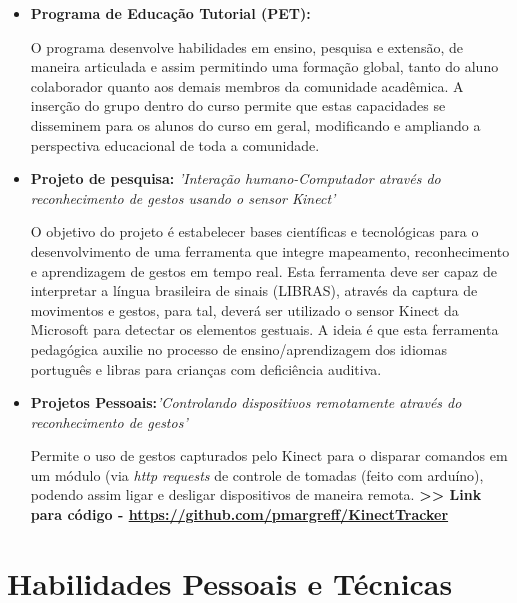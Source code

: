 \documentclass[11pt,a4paper,sans]{moderncv}        %
\begin{document}
\begin{itemize}

\item{\textbf{Programa de Educação Tutorial (PET):} \textit{}

\vspace{3pt}

\small{O programa desenvolve habilidades em ensino, pesquisa e extensão, de maneira articulada e assim permitindo uma formação global, tanto do aluno colaborador quanto aos demais membros da comunidade acadêmica. A inserção do grupo dentro do curso permite que estas capacidades se disseminem para os alunos do curso em geral, modificando e ampliando a perspectiva educacional de toda a comunidade.}}

\item{\textbf{Projeto de pesquisa: } \textit{'Interação humano-Computador através do reconhecimento de gestos usando o sensor Kinect'}

\vspace{3pt}

\small{O objetivo do projeto é estabelecer bases científicas e tecnológicas para o desenvolvimento de uma ferramenta que integre mapeamento, reconhecimento e aprendizagem de gestos em tempo real. Esta ferramenta deve ser capaz de interpretar a língua brasileira de sinais (LIBRAS), através da captura de movimentos e gestos, para tal, deverá ser utilizado o sensor Kinect da Microsoft para detectar os elementos gestuais. A ideia é que esta ferramenta pedagógica auxilie no processo de ensino/aprendizagem dos idiomas português e libras para crianças com deficiência auditiva.}}

\vspace{6pt}

\item{\textbf{Projetos Pessoais:}\textit{'Controlando dispositivos remotamente através do reconhecimento de gestos'}

\vspace{3pt}

\small{Permite o uso de gestos  capturados pelo Kinect para o disparar comandos em um módulo (via \textit{http requests} de controle de tomadas (feito com arduíno), podendo assim ligar e desligar dispositivos de maneira remota.
\textbf{ >> Link para código - \href{https://github.com/pmargreff/KinectTracker}{https://github.com/pmargreff/KinectTracker} }}
}
\end{itemize}
\section{Habilidades Pessoais e Técnicas}
\end{document}
